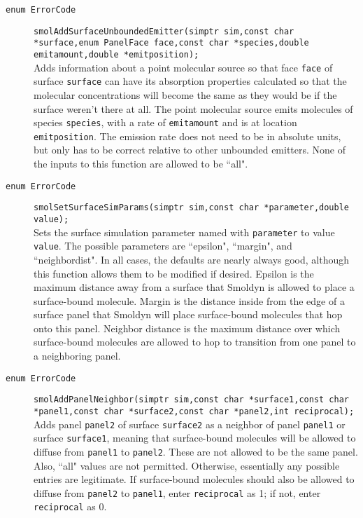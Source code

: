 \documentclass {book}
\begin{document}
\begin{description}
\item[\texttt{enum ErrorCode}]
\texttt{smolAddSurfaceUnboundedEmitter(simptr sim,const char *surface,enum PanelFace face,const char *species,double emitamount,double *emitposition);}
\hfill \\
Adds information about a point molecular source so that face \texttt{face} of surface \texttt{surface} can have its absorption properties calculated so that the molecular concentrations will become the same as they would be if the surface weren't there at all. The point molecular source emits molecules of species \texttt{species}, with a rate of \texttt{emitamount} and is at location \texttt{emitposition}. The emission rate does not need to be in absolute units, but only has to be correct relative to other unbounded emitters. None of the inputs to this function are allowed to be ``all".

\item[\texttt{enum ErrorCode}]
\texttt{smolSetSurfaceSimParams(simptr sim,const char *parameter,double value);}
\hfill \\
Sets the surface simulation parameter named with \texttt{parameter} to value \texttt{value}. The possible parameters are ``epsilon", ``margin", and ``neighbordist". In all cases, the defaults are nearly always good, although this function allows them to be modified if desired. Epsilon is the maximum distance away from a surface that Smoldyn is allowed to place a surface-bound molecule. Margin is the distance inside from the edge of a surface panel that Smoldyn will place surface-bound molecules that hop onto this panel. Neighbor distance is the maximum distance over which surface-bound molecules are allowed to hop to transition from one panel to a neighboring panel.

\item[\texttt{enum ErrorCode}]
\texttt{smolAddPanelNeighbor(simptr sim,const char *surface1,const char *panel1,const char *surface2,const char *panel2,int reciprocal);}
\hfill \\
Adds panel \texttt{panel2} of surface \texttt{surface2} as a neighbor of panel \texttt{panel1} or surface \texttt{surface1}, meaning that surface-bound molecules will be allowed to diffuse from \texttt{panel1} to \texttt{panel2}. These are not allowed to be the same panel. Also, ``all" values are not permitted. Otherwise, essentially any possible entries are legitimate. If surface-bound molecules should also be allowed to diffuse from \texttt{panel2} to \texttt{panel1}, enter \texttt{reciprocal} as 1; if not, enter \texttt{reciprocal} as 0.


\end{description}
\end{document}
